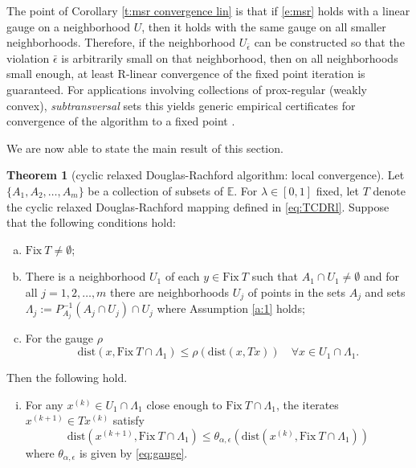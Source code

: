 \documentclass[12pt]{article}
\theoremstyle{definition}
\newtheorem{theorem}{Theorem}
\newcommand{\paren}[1]{\left(#1\right)}
\newcommand{\dist}{\mathrm{dist}}
\newcommand{\Fix}{\mathrm{Fix}\ }
\begin{document}
The point of Corollary \ref{t:msr convergence lin} is that
if \eqref{e:msr} holds with a linear gauge on a neighborhood $U$, then
it holds with the same gauge on all smaller neighborhoods.  Therefore, if
the neighborhood $U_{\bar\epsilon}$ can be constructed so that the
violation $\bar\epsilon$ is arbitrarily small on that neighborhood,
then on all neighborhoods small enough,
at least R-linear convergence of the fixed point iteration is guaranteed.
For applications involving collections of prox-regular (weakly convex), {\em subtransversal}
sets this yields generic
empirical certificates for convergence of the algorithm to a fixed point
\cite{luke2020convergence,DinJanLuk24}.

We are now able to state the main result of this section.
\begin{theorem}[cyclic relaxed Douglas-Rachford algorithm: local convergence]\label{theo:convergence.CDRl}
Let $\{A_1, A_2, \dots, A_m\}$ be a collection of subsets of $\mathbb{E}$.
For $\lambda\in [0,1]$ fixed, let $T$ denote the cyclic relaxed Douglas-Rachford mapping
defined in \eqref{eq:TCDRl}.
Suppose that the following conditions hold:
\begin{enumerate}[(a)]%
    \item\label{theo:convergence.CDRl a} $\Fix T\neq\emptyset$;
     \item\label{theo:convergence.CDRl b} There is a neighborhood $U_1$ of each $y\in\Fix T$ such that $A_1\cap U_1\neq\emptyset$ and for all $j=1,2,\dots,m$ there are neighborhoods $U_j$ of points in the sets $A_j$ and sets $\Lambda_j:=P^{-1}_{A_j} (A_j\cap U_j)\cap U_j$ where Assumption \ref{a:1} holds;
\item\label{theo:convergence.CDRl c} For the gauge $\rho$
   \begin{equation}\label{e:msr drl}
    \dist(x,\Fix T\cap \Lambda_1)\leq \rho(\dist(x, Tx))\quad\forall x\in U_1\cap \Lambda_1.
   \end{equation}
\end{enumerate}
Then the following hold.
\begin{enumerate}[(i)]
\item\label{theo:convergence.CDRl ii} For any $x^{(k)}\in U_1\cap\Lambda_1$ close enough to $\Fix T\cap \Lambda_1$,
the iterates $x^{(k+1)}\in Tx^{(k)}$ satisfy
\begin{equation}%
\dist\paren{x^{(k+1)}, \Fix T\cap \Lambda_1}
\leq \theta_{\alpha, \epsilon}\paren{\dist\paren{x^{(k)}, \Fix T\cap \Lambda_1}}
\end{equation}%
where $\theta_{\alpha, \epsilon}$ is given by \eqref{eq:gauge}.


\end{enumerate}
\end{theorem}
\end{document}
